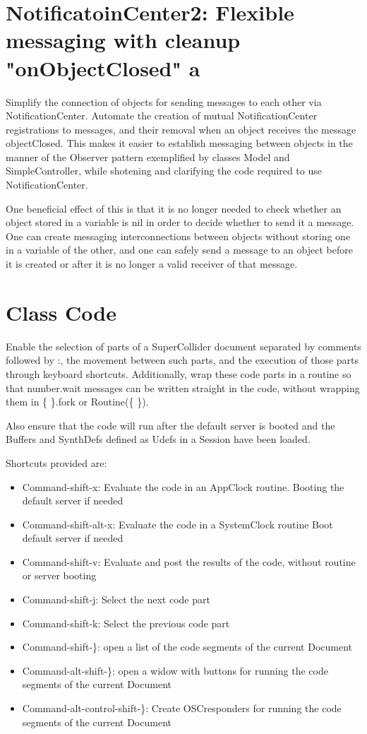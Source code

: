 \documentclass[11pt, a4paper]{scrartcl}
\begin{document}
\section*{NotificatoinCenter2: Flexible messaging with cleanup "onObjectClosed" a}
\label{sec-7}


Simplify the connection of objects for sending messages to each other via NotificationCenter. Automate the creation of mutual NotificationCenter registrations to messages, and their removal when an object receives the message objectClosed. This makes it easier to establish messaging between objects in the manner of the Observer pattern exemplified by classes Model and SimpleController, while shotening and clarifying the code required to use NotificationCenter.

One beneficial effect of this is that it is no longer needed to check whether an object stored in a variable is nil in order to decide whether to send it a message. One can create messaging interconnections between objects without storing one in a variable of the other, and one can safely send a message to an object before it is created or after it is no longer a valid receiver of that message. 
\section*{Class Code}
\label{sec-8}


Enable the selection of parts of a SuperCollider document separated by comments followed by :, the movement between such parts, and the execution of those parts through keyboard shortcuts. Additionally, wrap these code parts in a routine so that number.wait messages can be written straight in the code, without wrapping them in \{ \}.fork or Routine(\{ \}). 

Also ensure that the code will run after the default server is booted and the Buffers and SynthDefs defined as Udefs in a Session have been loaded. 

Shortcuts provided are:

\begin{itemize}
\item Command-shift-x: Evaluate the code in an AppClock routine. Booting the default server if needed
\item Command-shift-alt-x: Evaluate the code in a SystemClock routine Boot default server if needed
\item Command-shift-v: Evaluate and post the results of the code, without routine or server booting
\item Command-shift-j: Select the next code part
\item Command-shift-k: Select the previous code part
\item Command-shift-\}: open a list of the code segments of the current Document
\item Command-alt-shift-\}: open a widow with buttons for running the code segments of the current Document
\item Command-alt-control-shift-\}: Create OSCresponders for running the code segments of the current Document
\end{itemize}
\end{document}
